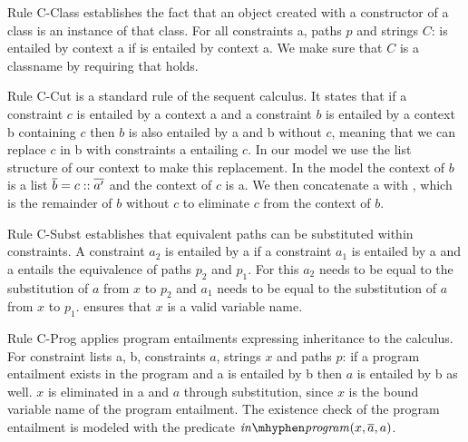 Rule C-Class establishes the fact that an object created with
a constructor of a class is an instance of that class.
For all constraints \ovl a, paths $p$ and strings $C$:
 is entailed by context \ovl a if
 is entailed by context \ovl a.
We make sure that $C$ is a classname by requiring that  holds.

Rule C-Cut is a standard rule of the sequent calculus.
It states that if a constraint $c$ is entailed by a context \ovl a
and a constraint $b$ is entailed by a context \ovl b containing $c$
then $b$ is also entailed by \ovl a and \ovl b without $c$,
meaning that we can replace $c$ in \ovl b with constraints \ovl a
entailing $c$.
In our model we use the list structure of our context to
make this replacement.
In the model the context of $b$ is a list $\overline{b} = c :: \overline{a'}$
and the context of $c$ is \ovl a.
We then concatenate \ovl a with , which is the remainder
of $b$ without $c$ to eliminate $c$ from the context of $b$.

Rule C-Subst establishes that equivalent paths can be substituted
within constraints.
A constraint $a_2$ is entailed by \ovl a if
a constraint $a_1$ is entailed by \ovl a
and \ovl a entails the equivalence of paths $p_2$ and $p_1$.
For this $a_2$ needs to be equal to the substitution of $a$ from $x$ to $p_2$
and $a_1$ needs to be equal to the substitution of $a$ from $x$ to $p_1$.
 ensures that $x$ is a valid variable name.

Rule C-Prog applies program entailments expressing inheritance to the calculus.
For constraint lists \ovl a, \ovl b, constraints $a$, strings $x$ and paths $p$:
if a program entailment  exists in the program
and \ovl a is entailed by \ovl b then $a$ is entailed by \ovl b as well.
$x$ is eliminated in \ovl a and $a$ through substitution,
since $x$ is the bound variable name of the program entailment.
The existence check of the program entailment is modeled with the predicate
$\inprog(x, \ovl a, a)$.

